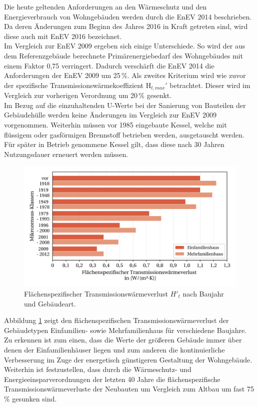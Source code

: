 Die heute geltenden Anforderungen an den Wärmeschutz und den Energieverbrauch von Wohngebäuden werden durch die EnEV 2014 beschrieben.
Da deren Änderungen zum Beginn des Jahres 2016 in Kraft getreten sind, wird diese auch mit EnEV 2016 bezeichnet.\\
Im Vergleich zur EnEV 2009 ergeben sich einige Unterschiede.
So wird der aus dem Referenzgebäude berechnete Primärenergiebedarf des Wohngebäudes mit einem Faktor 0,75 verringert.
Dadurch verschärft die EnEV 2014 die Anforderungen der EnEV 2009 um 25\,\%.
Als zweites Kriterium wird wie zuvor der spezifische Transmissionswärmekoeffizient H\(_{t, max}'\) betrachtet.
Dieser wird im Vergleich zur vorherigen Verordnung um 20\,\% gesenkt.\\
Im Bezug auf die einzuhaltenden U-Werte bei der Sanierung von Bauteilen der Gebäudehülle werden keine Änderungen im Vergleich zur EnEV 2009 vorgenommen.
Weiterhin müssen vor 1985 eingebaute Kessel, welche mit flüssigem oder gasförmigen Brennstoff betrieben werden, ausgetauscht werden.
Für später in Betrieb genommene Kessel gilt, dass diese nach 30 Jahren Nutzungsdauer erneuert werden müssen. \cite{Heikrodt.2014}

\begin{figure}[H]
	\centering
		\includegraphics{Pictures/TransmissionswaermekoeffizientBaujahr.jpg}
	\caption{Flächenspezifischer Transmissionswärmeverlust \(H'_t\) nach Baujahr und Gebäudeart. \cite{Bigalke.2016}}
	\label{fig: Abbildung221} 
\end{figure}

Abbildung \ref{fig: Abbildung221} zeigt den flächenspezifischen Transmissionswärmeverlust der Gebäudetypen Einfamilien- sowie Mehrfamilienhaus für verschiedene Baujahre. 
Zu erkennen ist zum einen, dass die Werte der größeren Gebäude immer über denen der Einfamilienhäuser liegen und zum anderen die kontinuierliche Verbesserung im Zuge der energetisch günstigeren Gestaltung der Wohngebäude.
Weiterhin ist festzustellen, dass durch die Wärmeschutz- und Energieeinsparverordnungen der letzten 40 Jahre die flächenspezifische Transmissionswärmeverluste der Neubauten um Vergleich zum Altbau um fast 75\,\% gesunken sind.


